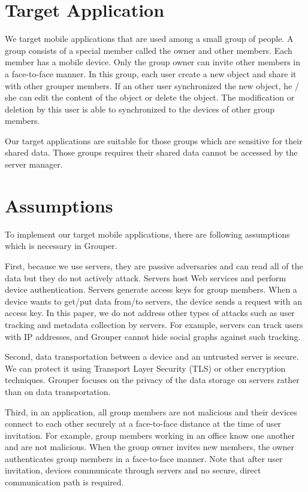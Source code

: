 \documentclass[a4paper,11pt]{report}
\begin{document}
\section{Target Application}

We target mobile applications that are used among a small group of people.
A group consists of a special member called the owner and other members.
Each member has a mobile device.
Only the group owner can invite other members in a face-to-face manner.
In this group, each user create a new object and share it with other grouper members.
If an other user synchronized the new object, he / she can edit the content of the object or delete the object.
The modification or deletion by this user is able to synchronized to the devices of other group members.

Our target applications are suitable for those groups which are sensitive for their shared data.
Those groups requires their shared data cannot be accessed by the server manager.

\section{Assumptions}

To implement our target mobile applications, there are following assumptions which is necessary in Grouper.

First, because we use servers, they are passive adversaries and can read all of the data but they do not actively attack.
Servers host Web services and perform device authentication.
Servers generate access keys for group members. 
When a device wants to get/put data from/to servers, the device sends a request with an access key.
In this paper, we do not address other types of attacks such as user tracking and metadata collection by servers. 
For example, servers can track users with IP addresses, and Grouper cannot hide social graphs against such tracking.

Second, data transportation between a device and an untrusted server is secure.
We can protect it using Transport Layer Security (TLS) or other encryption techniques.
Grouper focuses on the privacy of the data storage on servers rather than on data transportation.

Third, in an application, all group members are not malicious and their devices connect to each other securely at a face-to-face distance at the time of user invitation.
For example, group members working in an office know one another and are not malicious.
When the group owner invites new members, the owner authenticates group members in a face-to-face manner.
Note that after user invitation, devices communicate through servers and no secure, direct communication path is required.
\end{document}
